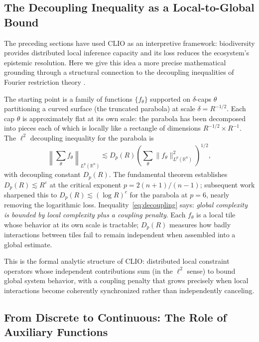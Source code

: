 \documentclass[12pt]{article}
\newcommand{\R}{\mathbb{R}}
\begin{document}
\subsection{The Decoupling Inequality as a Local-to-Global Bound}

The preceding sections have used CLIO as an interpretive framework: biodiversity provides
distributed local inference capacity and its loss reduces the ecosystem's epistemic
resolution. Here we give this idea a more precise mathematical grounding through a
structural connection to the decoupling inequalities of Fourier restriction theory
\citep{BourgainDemeter2015,Guth2016}.

The starting point is a family of functions $\{f_\theta\}$ supported on $\delta$-caps
$\theta$ partitioning a curved surface (the truncated parabola) at scale
$\delta=R^{-1/2}$. Each cap $\theta$ is approximately flat at its own scale: the
parabola has been decomposed into pieces each of which is locally like a rectangle of
dimensions $R^{-1/2}\times R^{-1}$. The $\ell^2$ decoupling inequality for the parabola
is
\begin{equation}
\label{eq:decoupling}
\left\|\sum_{\theta} f_\theta\right\|_{L^p(\R^n)}
\lesssim D_p(R)
\left(\sum_{\theta} \|f_\theta\|_{L^p(\R^n)}^2\right)^{1/2},
\end{equation}
with decoupling constant $D_p(R)$. The fundamental theorem \citep{BourgainDemeter2015}
establishes $D_p(R)\lesssim R^\varepsilon$ at the critical exponent $p=2(n+1)/(n-1)$;
subsequent work \citep{GuthMaldagueWang2022} sharpened this to
$D_p(R)\lesssim(\log R)^c$ for the parabola at $p=6$, nearly removing the logarithmic
loss. Inequality~\eqref{eq:decoupling} says: \emph{global complexity is bounded by local
complexity plus a coupling penalty}. Each $f_\theta$ is a local tile whose behavior at
its own scale is tractable; $D_p(R)$ measures how badly interactions between tiles
fail to remain independent when assembled into a global estimate.

This is the formal analytic structure of CLIO: distributed local constraint operators
whose independent contributions sum (in the $\ell^2$ sense) to bound global system
behavior, with a coupling penalty that grows precisely when local interactions become
coherently synchronized rather than independently canceling.

\subsection{From Discrete to Continuous: The Role of Auxiliary Functions}
\end{document}
